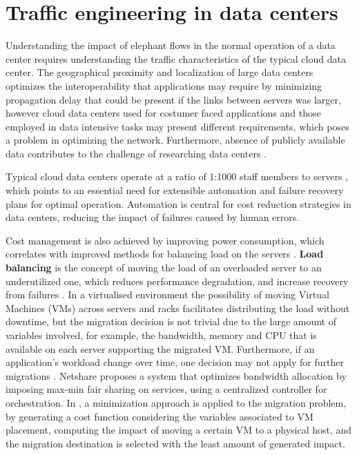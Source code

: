 \section {Traffic engineering in data centers}

Understanding the impact of elephant flows in the normal operation of a data center requires understanding the traffic characteristics of the typical cloud 
data center. The geographical proximity and localization of large data centers optimizes the interoperability that applications may require by minimizing 
propagation delay that could be present if the links between servers was larger, however cloud data centers used for costumer faced applications and those employed
in data intensive tasks may present different requirements, which poses a problem in optimizing the network. Furthermore, absence of publicly available data
contributes to the challenge of researching data centers \cite{CITE - network_traffic_characteristics_wild.pdf}.

\par Typical cloud data centers operate at a ratio of 1:1000 staff members to servers \cite{CITE - cloud_dc_research_problems}, which points to an essential need for 
extensible automation and failure recovery plans for optimal operation. Automation is central for cost reduction strategies in data centers, reducing the 
impact of failures caused by human errors.

\par Cost management is also achieved by improving power consumption, which correlates with improved methods for balancing load on the servers 
\cite{CITE - performance_optimization_virtual_machine_placement}. \textbf{Load balancing} is the concept of moving the load of an overloaded server to an underutilized one,
which reduces performance degradation, and increase recovery from failures \cite{CITE - server_storage_virtualization}. In a virtualised environment the possibility
of moving Virtual Machines (VMs) across servers and racks facilitates distributing the load without downtime, but the migration decision is not trivial due to the
large amount of variables involved, for example, the bandwidth, memory and CPU that is available on each server supporting the migrated VM. Furthermore, if an
application's workload change over time, one decision may not apply for further migrations \cite{CITE - multi_objective_vm_cloud_dc}. Netshare
\cite{CITE - netshare_predictable_bw_allocation.pdf} proposes a system that optimizes bandwidth allocation by imposing max-min fair sharing on services, using a 
centralized controller for orchestration. In \cite{CITE - application_aware_vm_migration}, a minimization approach is applied to the migration problem, by generating
a cost function considering the variables associated to VM placement, computing the impact of moving a certain VM to a physical host, and the migration destination
is selected with the least amount of generated impact.

